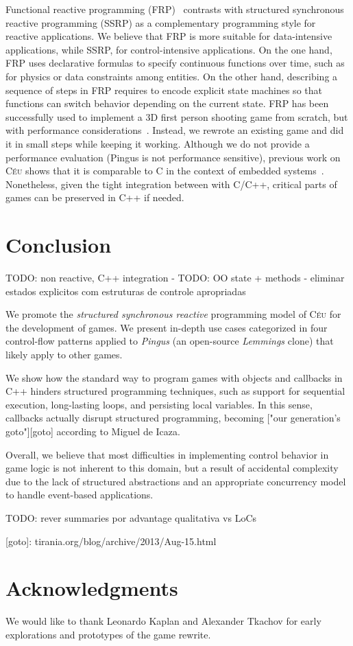 \documentclass{vgtc}                          %
\newcommand{\CEU}{\textsc{C\'{e}u}\xspace}
\begin{document}
Functional reactive programming (FRP)~\cite{frp.fran} contrasts with
structured synchronous reactive programming (SSRP) as a complementary
programming style for reactive applications.
%
We believe that FRP is more suitable for data-intensive applications, while 
SSRP, for control-intensive applications.
%
On the one hand, FRP uses declarative formulas to specify continuous functions 
over time, such as for physics or data constraints among entities.
%
On the other hand, describing a sequence of steps in FRP requires to encode 
explicit state machines so that functions can switch behavior depending on the 
current state.
%
FRP has been successfully used to implement a 3D first person shooting game
from scratch, but with performance considerations~\cite{games.frag}.
%
Instead, we rewrote an existing game and did it in small steps while keeping it
working.
Although we do not provide a performance evaluation (Pingus is not performance
sensitive), previous work on \CEU shows that it is comparable to C in the
context of embedded systems~\cite{ceu.sensys13}.
Nonetheless, given the tight integration between with C/C++, critical parts of
games can be preserved in C++ if needed.

\section{Conclusion}
\label{sec.conclusion}

TODO: non reactive, C++ integration
- TODO: OO state + methods
- eliminar estados explicitos com estruturas de controle apropriadas

We promote the \emph{structured synchronous reactive} programming model of
\CEU for the development of games.
We present in-depth use cases categorized in four control-flow patterns applied
to \emph{Pingus} (an open-source \emph{Lemmings} clone) that likely apply to
other games.

We show how the standard way to program games with objects and callbacks in C++
hinders structured programming techniques, such as support for sequential
execution, long-lasting loops, and persisting local variables.
In this sense, callbacks actually disrupt structured programming, becoming
["our generation’s goto"][goto] according to Miguel de Icaza.

Overall, we believe that most difficulties in implementing control behavior in 
game logic is not inherent to this domain, but a result of accidental
complexity due to the lack of structured abstractions and an appropriate
concurrency model to handle event-based applications.

TODO: rever summaries por advantage qualitativa vs LoCs

[goto]: tirania.org/blog/archive/2013/Aug-15.html

\section{Acknowledgments}

We would like to thank Leonardo Kaplan and Alexander Tkachov for early
explorations and prototypes of the game rewrite.



\end{document}
